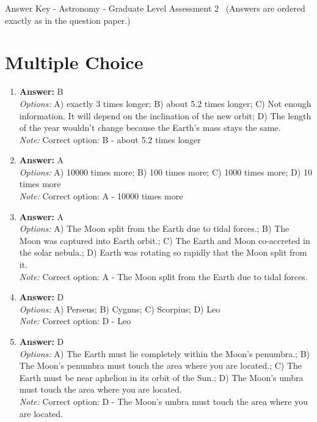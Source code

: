 \documentclass[12pt]{article}
\begin{document}
\begin{center}
Answer Key - Astronomy - Graduate Level Assessment 2 \
\small (Answers are ordered exactly as in the question paper.)
\end{center}

\section*{Multiple Choice}
\begin{enumerate}[label=\arabic*.]
\item \textbf{Answer:} B
\\ \textit{Options:} A) exactly 3 times longer; B) about 5.2 times longer; C) Not enough information. It will depend on the inclination of the new orbit; D) The length of the year wouldn't change because the Earth's mass stays the same.
\\ \textit{Note:} Correct option: B - about 5.2 times longer
\item \textbf{Answer:} A
\\ \textit{Options:} A) 10000 times more; B) 100 times more; C) 1000 times more; D) 10 times more
\\ \textit{Note:} Correct option: A - 10000 times more
\item \textbf{Answer:} A
\\ \textit{Options:} A) The Moon split from the Earth due to tidal forces.; B) The Moon was captured into Earth orbit.; C) The Earth and Moon co-accreted in the solar nebula.; D) Earth was rotating so rapidly that the Moon split from it.
\\ \textit{Note:} Correct option: A - The Moon split from the Earth due to tidal forces.
\item \textbf{Answer:} D
\\ \textit{Options:} A) Perseus; B) Cygnus; C) Scorpius; D) Leo
\\ \textit{Note:} Correct option: D - Leo
\item \textbf{Answer:} D
\\ \textit{Options:} A) The Earth must lie completely within the Moon's penumbra.; B) The Moon's penumbra must touch the area where you are located.; C) The Earth must be near aphelion in its orbit of the Sun.; D) The Moon's umbra must touch the area where you are located.
\\ \textit{Note:} Correct option: D - The Moon's umbra must touch the area where you are located.
\end{enumerate}
\end{document}
